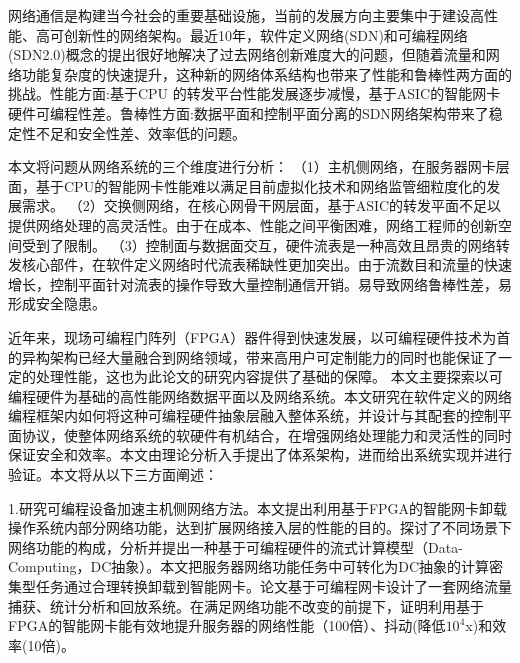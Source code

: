 
\setcounter{page}{1}

%
%
%

网络通信是构建当今社会的重要基础设施，当前的发展方向主要集中于建设高性能、高可创新性的网络架构。最近10年，软件定义网络(SDN)和可编程网络(SDN2.0)概念的提出很好地解决了过去网络创新难度大的问题，但随着流量和网络功能复杂度的快速提升，这种新的网络体系结构也带来了性能和鲁棒性两方面的挑战。性能方面:基于CPU 的转发平台性能发展逐步减慢，基于ASIC的智能网卡硬件可编程性差。鲁棒性方面:数据平面和控制平面分离的SDN网络架构带来了稳定性不足和安全性差、效率低的问题。

本文将问题从网络系统的三个维度进行分析：
（1）主机侧网络，在服务器网卡层面，基于CPU的智能网卡性能难以满足目前虚拟化技术和网络监管细粒度化的发展需求。
（2）交换侧网络，在核心网骨干网层面，基于ASIC的转发平面不足以提供网络处理的高灵活性。由于在成本、性能之间平衡困难，网络工程师的创新空间受到了限制。
（3）控制面与数据面交互，硬件流表是一种高效且昂贵的网络转发核心部件，在软件定义网络时代流表稀缺性更加突出。由于流数目和流量的快速增长，控制平面针对流表的操作导致大量控制通信开销。易导致网络鲁棒性差，易形成安全隐患。

近年来，现场可编程门阵列（FPGA）器件得到快速发展，以可编程硬件技术为首的异构架构已经大量融合到网络领域，带来高用户可定制能力的同时也能保证了一定的处理性能，这也为此论文的研究内容提供了基础的保障。
本文主要探索以可编程硬件为基础的高性能网络数据平面以及网络系统。本文研究在软件定义的网络编程框架内如何将这种可编程硬件抽象层融入整体系统，并设计与其配套的控制平面协议，使整体网络系统的软硬件有机结合，在增强网络处理能力和灵活性的同时保证安全和效率。本文由理论分析入手提出了体系架构，进而给出系统实现并进行验证。本文将从以下三方面阐述：

1.研究可编程设备加速主机侧网络方法。本文提出利用基于FPGA的智能网卡卸载操作系统内部分网络功能，达到扩展网络接入层的性能的目的。探讨了不同场景下网络功能的构成，分析并提出一种基于可编程硬件的流式计算模型（Data-Computing，DC抽象）。本文把服务器网络功能任务中可转化为DC抽象的计算密集型任务通过合理转换卸载到智能网卡。论文基于可编程网卡设计了一套网络流量捕获、统计分析和回放系统。在满足网络功能不改变的前提下，证明利用基于FPGA的智能网卡能有效地提升服务器的网络性能（100倍）、抖动(降低$10^4$x)和效率(10倍)。

